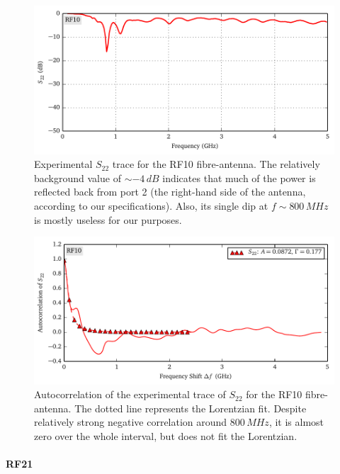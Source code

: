 \begin{figure}
 \centering
 \includegraphics{figs/active/RF10-sParameters.pdf}
 \caption[Experimental $S_{22}$ trace of the RF10 fibre-antenna]
 		{Experimental $S_{22}$ trace for the RF10 fibre-antenna. 
 		The relatively background value of $\sim -4\,\unit{dB}$ indicates
 		that much of the power is reflected back from port 2 (the right-hand side of
 		the antenna, according to our specifications). Also, its single dip at $f\sim800\,\unit{MHz}$
 		is mostly useless for our purposes.}
 \label{fig:active.lcx.rf10sParameters}
\end{figure}

\begin{figure}
 \centering
 \includegraphics{figs/active/RF10-autoCorrelation.pdf}
 \caption[Autocorrelation of the experimental trace of $S_{22}$ for the RF10 fibre-antenna]
 		{Autocorrelation of the experimental trace of $S_{22}$ for the RF10 fibre-antenna.
 		The dotted line represents the Lorentzian fit. Despite relatively strong negative correlation around $800\,\unit{MHz}$,
 		it is almost zero over the whole interval, but does not fit the Lorentzian.}
 \label{fig:active.lcx.rf10autocorrelation}
\end{figure}

\paragraph{RF21}


